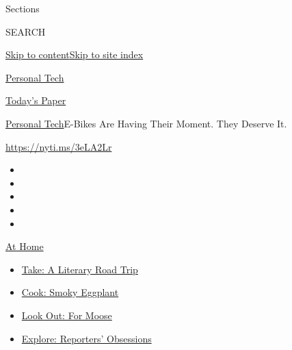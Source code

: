 Sections

SEARCH

\protect\hyperlink{site-content}{Skip to
content}\protect\hyperlink{site-index}{Skip to site index}

\href{https://www.nytimes3xbfgragh.onion/section/technology/personaltech}{Personal
Tech}

\href{https://myaccount.nytimes3xbfgragh.onion/auth/login?response_type=cookie\&client_id=vi}{}

\href{https://www.nytimes3xbfgragh.onion/section/todayspaper}{Today's
Paper}

\href{/section/technology/personaltech}{Personal Tech}\textbar{}E-Bikes
Are Having Their Moment. They Deserve It.

\href{https://nyti.ms/3eLA2Lr}{https://nyti.ms/3eLA2Lr}

\begin{itemize}
\item
\item
\item
\item
\item
\end{itemize}

\href{https://www.nytimes3xbfgragh.onion/spotlight/at-home?action=click\&pgtype=Article\&state=default\&region=TOP_BANNER\&context=at_home_menu}{At
Home}

\begin{itemize}
\tightlist
\item
  \href{https://www.nytimes3xbfgragh.onion/2020/07/28/books/time-for-a-literary-road-trip.html?action=click\&pgtype=Article\&state=default\&region=TOP_BANNER\&context=at_home_menu}{Take:
  A Literary Road Trip}
\item
  \href{https://www.nytimes3xbfgragh.onion/2020/07/29/magazine/bored-with-your-home-cooking-some-smoky-eggplant-will-fix-that.html?action=click\&pgtype=Article\&state=default\&region=TOP_BANNER\&context=at_home_menu}{Cook:
  Smoky Eggplant}
\item
  \href{https://www.nytimes3xbfgragh.onion/2020/07/27/travel/moose-michigan-isle-royale.html?action=click\&pgtype=Article\&state=default\&region=TOP_BANNER\&context=at_home_menu}{Look
  Out: For Moose}
\item
  \href{https://www.nytimes3xbfgragh.onion/interactive/2020/at-home/even-more-reporters-editors-diaries-lists-recommendations.html?action=click\&pgtype=Article\&state=default\&region=TOP_BANNER\&context=at_home_menu}{Explore:
  Reporters' Obsessions}
\end{itemize}

